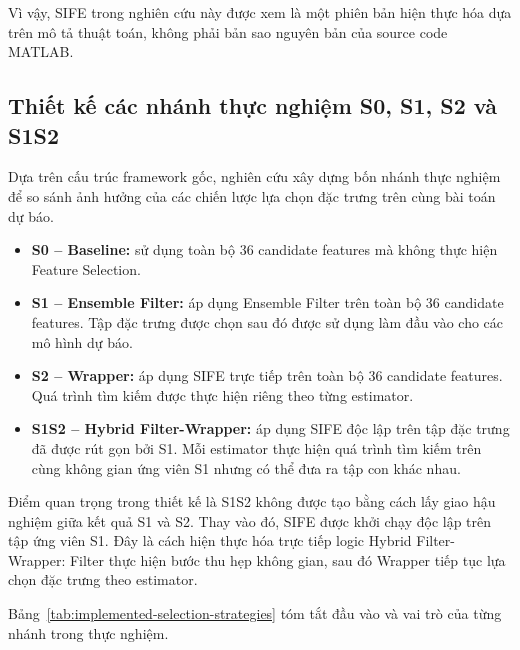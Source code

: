 Vì vậy, SIFE trong nghiên cứu này được xem là một phiên bản
hiện thực hóa dựa trên mô tả thuật toán, không phải bản sao
nguyên bản của source code MATLAB.

\subsection{Thiết kế các nhánh thực nghiệm S0, S1, S2 và S1S2}
\label{subsec:implemented-selection-strategies}

Dựa trên cấu trúc framework gốc, nghiên cứu xây dựng bốn nhánh
thực nghiệm để so sánh ảnh hưởng của các chiến lược lựa chọn
đặc trưng trên cùng bài toán dự báo.

\begin{itemize}
    \item \textbf{S0 -- Baseline:} sử dụng toàn bộ 36 candidate
    features mà không thực hiện Feature Selection.

    \item \textbf{S1 -- Ensemble Filter:} áp dụng Ensemble Filter
    trên toàn bộ 36 candidate features. Tập đặc trưng được chọn
    sau đó được sử dụng làm đầu vào cho các mô hình dự báo.

    \item \textbf{S2 -- Wrapper:} áp dụng SIFE trực tiếp trên
    toàn bộ 36 candidate features. Quá trình tìm kiếm được
    thực hiện riêng theo từng estimator.

    \item \textbf{S1S2 -- Hybrid Filter-Wrapper:} áp dụng SIFE
    độc lập trên tập đặc trưng đã được rút gọn bởi S1. Mỗi
    estimator thực hiện quá trình tìm kiếm trên cùng không
    gian ứng viên S1 nhưng có thể đưa ra tập con khác nhau.
\end{itemize}

Điểm quan trọng trong thiết kế là S1S2 không được tạo bằng cách
lấy giao hậu nghiệm giữa kết quả S1 và S2. Thay vào đó, SIFE
được khởi chạy độc lập trên tập ứng viên S1. Đây là cách hiện
thực hóa trực tiếp logic Hybrid Filter-Wrapper: Filter thực
hiện bước thu hẹp không gian, sau đó Wrapper tiếp tục lựa
chọn đặc trưng theo estimator.

Bảng~\ref{tab:implemented-selection-strategies} tóm tắt
đầu vào và vai trò của từng nhánh trong thực nghiệm.

